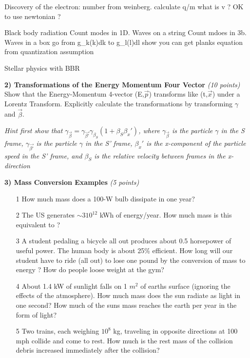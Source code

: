 {\large

Discovery of the electron:
number from weinberg.
calculate q/m
what is v ? OK to use newtonian ?

Black body radiation
Count modes in 1D. Waves on a string
Count mdoes in 3b. Waves in a box
go from g_k(k)dk to g_l(l)dl
show you can get planks equation from quantization assumption

Stellar physics with BBR


\textbf{2) Transformations of the Energy Momentum Four Vector } \hfill \textit{(10 points)}\\
Show that the Energy-Momentum 4-vector (E,$\vec{p}$) transforms like (t,$\vec{x}$) under a Lorentz Transform.
Explicitly calculate the transformations by transforming $\gamma$ and $\vec{\beta}$.

\textit{Hint first show that $\gamma_{\vec{\beta}} = \gamma_{\vec{\beta'}}\gamma_{\beta_S}(1+\beta_{S} \beta_{x}')$,
where $\gamma_{\vec{\beta}}$ is the particle $\gamma$ in the S frame,
      $\gamma_{\vec{\beta'}}$ is the particle $\gamma$ in the S' frame, $\beta_{x}'$ is the x-component of the particle speed in the S' frame, and $\beta_{S}$ is the relative velocity between frames in the x-direction}


\vspace*{0.25in}

\textbf{3) Mass Conversion Examples } \hfill \textit{(5 points)}\\
\begin{itemize}
\item[1] How much mass does a 100-W bulb dissipate in one year?
\item[2] The US generates $\sim 3 10^{12}$ kWh of energy/year. How much mass is this equivalent to ?
\item[3] A student pedaling a bicycle all out produces about 0.5 horsepower of useful power. The human body is about 25\% efficient.
         How long will our student have to ride (all out) to lose one pound by the conversion of mass to energy ? How do people loose weight at the gym?
\item[4] About 1.4 kW of sunlight falls on 1 $m^2$ of earths surface (ignoring the effects of the atmosphere). How much mass does the sun radiate as light in one second?
         How much of the suns mass reaches the earth per year in the form of light?
\item[5] Two trains, each weighing $10^8$ kg, traveling in opposite directions at 100 mph collide and come to rest. How much is the rest mass of the collision debris increased immediately after the collision?
\end{itemize}

}
